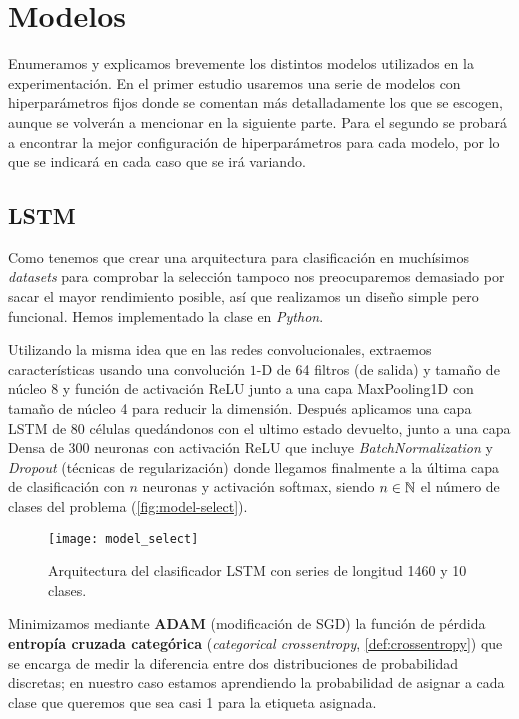 \section{Modelos}

Enumeramos y explicamos brevemente los distintos modelos utilizados en la experimentación. En el primer estudio usaremos una serie de modelos con hiperparámetros fijos donde se comentan más detalladamente los que se escogen, aunque se volverán a mencionar en la siguiente parte. Para el segundo se probará a encontrar la mejor configuración de hiperparámetros para cada modelo, por lo que se indicará en cada caso que se irá variando.

\subsection{LSTM}

Como tenemos que crear una arquitectura para clasificación en muchísimos \emph{datasets} para comprobar la selección tampoco nos preocuparemos demasiado por sacar el mayor rendimiento posible, así que realizamos un diseño simple pero funcional. Hemos implementado la clase en \emph{Python}.

Utilizando la misma idea que en las redes convolucionales, extraemos características usando una convolución $1$-D de 64 filtros (de salida) y tamaño de núcleo 8 y función de activación ReLU junto a una capa MaxPooling1D con tamaño de núcleo 4 para reducir la dimensión. Después aplicamos una capa LSTM de 80 células quedándonos con el ultimo estado devuelto, junto a una capa Densa de 300 neuronas con activación ReLU que incluye \emph{BatchNormalization} y \emph{Dropout} (técnicas de regularización) donde llegamos finalmente a la última capa de clasificación con $n$ neuronas y activación softmax, siendo $n \in \mathbb{N}$ el número de clases del problema (\autoref{fig:model-select}).

\begin{figure}[htbp]
  \centering
  \texttt{[image: model\_select]}
  \caption{Arquitectura del clasificador LSTM con series de longitud 1460 y 10 clases.}
  \label{fig:model-select}
\end{figure}

Minimizamos mediante \textbf{ADAM} (modificación de SGD) la función de pérdida \textbf{entropía cruzada categórica} (\emph{categorical crossentropy}, \autoref{def:crossentropy}) que se encarga de medir la diferencia entre dos distribuciones de probabilidad discretas; en nuestro caso estamos aprendiendo la probabilidad de asignar a cada clase que queremos que sea casi 1 para la etiqueta asignada.

